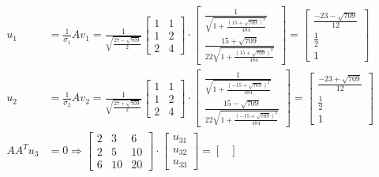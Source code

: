 \documentclass[a4paper, spanish]{article}
\begin{document}
    \begin{align}
      u_1 &=
      \frac{1}{\sigma_1}Av_1 =
      \frac{1}{\sqrt{\frac{27 - \sqrt{709}}{2}}}
      \begin{bmatrix}
        1 & 1\\
        1 & 2\\
        2 & 4
      \end{bmatrix}
      \cdot
      \begin{bmatrix}
        \frac{1}{\sqrt{1 + \frac{(15 + \sqrt{709})^2}{484}}} \\
        \frac{15 + \sqrt{709}}{22\sqrt{1 + \frac{(15 + \sqrt{709})^2}{484}}}
      \end{bmatrix}
      =
      \begin{bmatrix}
        \frac{-23-\sqrt{709}}{12} \\
        \frac{1}{2} \\
        1
      \end{bmatrix} \\
      u_2 &=
      \frac{1}{\sigma_2}Av_2 =
      \frac{1}{\sqrt{\frac{27 + \sqrt{709}}{2}}}
      \begin{bmatrix}
        1 & 1\\
        1 & 2\\
        2 & 4
      \end{bmatrix}
      \cdot
      \begin{bmatrix}
        \frac{1}{\sqrt{1 + \frac{(- 15 + \sqrt{709})^2}{484}}} \\
        \frac{15 - \sqrt{709}}{22\sqrt{1 + \frac{(- 15 + \sqrt{709})^2}{484}}}
      \end{bmatrix}
      =
      \begin{bmatrix}
        \frac{-23+\sqrt{709}}{12} \\
        \frac{1}{2} \\
        1
      \end{bmatrix}\\
      AA^T u_3 &= 0
      \Rightarrow
      \begin{bmatrix}
        2 & 3 & 6 \\
        2 & 5 & 10 \\
        6 & 10 & 20
      \end{bmatrix}
      \cdot
      \begin{bmatrix}
        u_{31} \\
        u_{32} \\
        u_{33}
      \end{bmatrix}
      =
      \begin{bmatrix}

\end{bmatrix}
\end{align}
\end{document}
